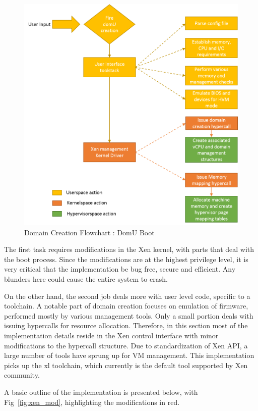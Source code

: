 \begin{figure}[h]
\centering
\includegraphics[scale=0.9]{figures/domain_creation2.png}
\caption{Domain Creation Flowchart : DomU Boot}
\label{fig:dom_flowchart}
\end{figure}
The first task requires modifications in the Xen kernel, with parts that deal with the boot process. Since the modifications are at the highest privilege level, it is very critical that the implementation be bug free, secure and efficient. Any blunders here could cause the entire system to crash.

On the other hand, the second job deals more with user level code, specific to a toolchain. A notable part of domain creation focuses on emulation of firmware, performed mostly by various management tools. Only a small portion deals with issuing hypercalls for resource allocation. Therefore, in this section most of the implementation details reside in the Xen control interface with minor modifications to the hypercall structure. Due to standardization of Xen API, a large number of tools have sprung up for VM management. This implementation picks up the xl toolchain, which currently is the default tool supported by Xen community.

A basic outline of the implementation is presented below, with Fig~\ref{fig:xen_mod}, highlighting the modifications in red.

